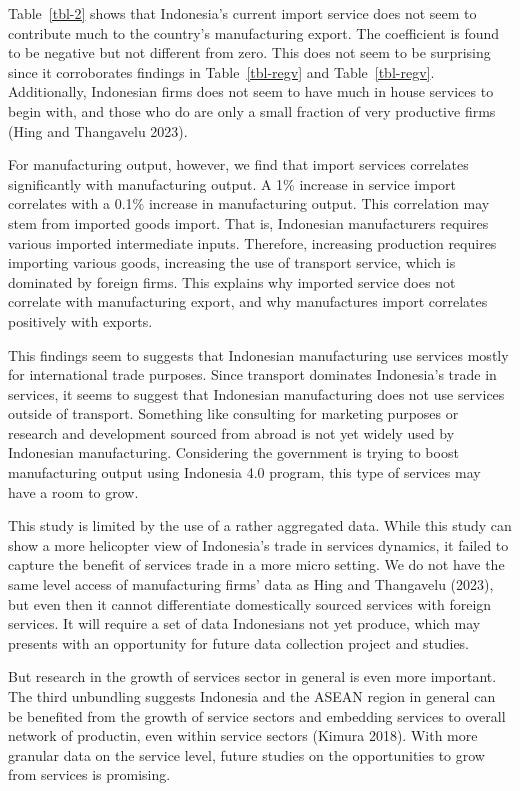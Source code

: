 \documentclass[
  letterpaper,
  DIV=11,
  numbers=noendperiod]{scrartcl}
\begin{document}
Table~\ref{tbl-2} shows that Indonesia's current import service does not
seem to contribute much to the country's manufacturing export. The
coefficient is found to be negative but not different from zero. This
does not seem to be surprising since it corroborates findings in
Table~\ref{tbl-regv} and Table~\ref{tbl-regv}. Additionally, Indonesian
firms does not seem to have much in house services to begin with, and
those who do are only a small fraction of very productive firms (Hing
and Thangavelu 2023).

For manufacturing output, however, we find that import services
correlates significantly with manufacturing output. A 1\% increase in
service import correlates with a 0.1\% increase in manufacturing output.
This correlation may stem from imported goods import. That is,
Indonesian manufacturers requires various imported intermediate inputs.
Therefore, increasing production requires importing various goods,
increasing the use of transport service, which is dominated by foreign
firms. This explains why imported service does not correlate with
manufacturing export, and why manufactures import correlates positively
with exports.

This findings seem to suggests that Indonesian manufacturing use
services mostly for international trade purposes. Since transport
dominates Indonesia's trade in services, it seems to suggest that
Indonesian manufacturing does not use services outside of transport.
Something like consulting for marketing purposes or research and
development sourced from abroad is not yet widely used by Indonesian
manufacturing. Considering the government is trying to boost
manufacturing output using Indonesia 4.0 program, this type of services
may have a room to grow.

This study is limited by the use of a rather aggregated data. While this
study can show a more helicopter view of Indonesia's trade in services
dynamics, it failed to capture the benefit of services trade in a more
micro setting. We do not have the same level access of manufacturing
firms' data as Hing and Thangavelu (2023), but even then it cannot
differentiate domestically sourced services with foreign services. It
will require a set of data Indonesians not yet produce, which may
presents with an opportunity for future data collection project and
studies.

But research in the growth of services sector in general is even more
important. The third unbundling suggests Indonesia and the ASEAN region
in general can be benefited from the growth of service sectors and
embedding services to overall network of productin, even within service
sectors (Kimura 2018). With more granular data on the service level,
future studies on the opportunities to grow from services is promising.
\end{document}
